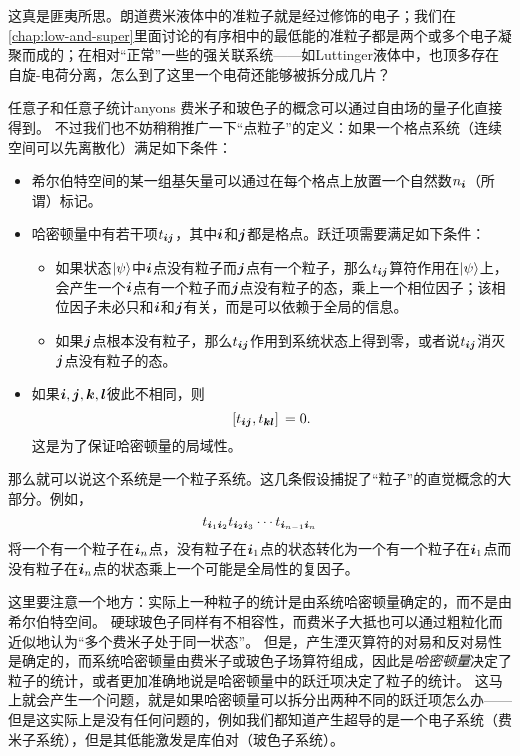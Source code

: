 这真是匪夷所思。朗道费米液体中的准粒子就是经过修饰的电子；我们在\autoref{chap:low-and-super}里面讨论的有序相中的最低能的准粒子都是两个或多个电子凝聚而成的；在相对“正常”一些的强关联系统——如Luttinger液体中，也顶多存在自旋-电荷分离，怎么到了这里一个电荷还能够被拆分成几片？



\begin{back}{任意子和任意子统计}{anyons}
    费米子和玻色子的概念可以通过自由场的量子化直接得到。
    不过我们也不妨稍稍推广一下“点粒子”的定义：如果一个格点系统（连续空间可以先离散化）满足如下条件：
    \begin{itemize}
        \item 希尔伯特空间的某一组基矢量可以通过在每个格点上放置一个自然数$n_{\vb*{i}}$（所谓）标记。
        \item 哈密顿量中有若干项$t_{\vb*{i} \vb*{j}}$，其中$\vb*{i}$和$\vb*{j}$都是格点。跃迁项需要满足如下条件：
        \begin{itemize}
            \item 如果状态$\ket{\psi}$中$\vb*{i}$点没有粒子而$\vb*{j}$点有一个粒子，那么$t_{\vb*{i} \vb*{j}}$算符作用在$\ket{\psi}$上，会产生一个$\vb*{i}$点有一个粒子而$\vb*{j}$点没有粒子的态，乘上一个相位因子；该相位因子未必只和$\vb*{i}$和$\vb*{j}$有关，而是可以依赖于全局的信息。
            \item 如果$\vb*{j}$点根本没有粒子，那么$t_{\vb*{i} \vb*{j}}$作用到系统状态上得到零，或者说$t_{\vb*{i} \vb*{j}}$消灭$\vb*{j}$点没有粒子的态。
        \end{itemize}
        \item 如果$\vb*{i}, \vb*{j}, \vb*{k}, \vb*{l}$彼此不相同，则
        \begin{equation}
            \comm*{t_{\vb*{i} \vb*{j}}}{t_{\vb*{k} \vb*{l}}} = 0.
        \end{equation}
        这是为了保证哈密顿量的局域性。
    \end{itemize}
    那么就可以说这个系统是一个粒子系统。这几条假设捕捉了“粒子”的直觉概念的大部分。例如，
    \[
        t_{\vb*{i}_1 \vb*{i}_2} t_{\vb*{i}_2 \vb*{i}_3} \cdots t_{\vb*{i}_{n-1} \vb*{i}_n} 
    \]
    将一个有一个粒子在$\vb*{i}_n$点，没有粒子在$\vb*{i}_1$点的状态转化为一个有一个粒子在$\vb*{i}_1$点而没有粒子在$\vb*{i}_n$点的状态乘上一个可能是全局性的复因子。

    这里要注意一个地方：实际上一种粒子的统计是由系统哈密顿量确定的，而不是由希尔伯特空间。
    硬球玻色子同样有不相容性，而费米子大抵也可以通过粗粒化而近似地认为“多个费米子处于同一状态”。
    但是，产生湮灭算符的对易和反对易性是确定的，而系统哈密顿量由费米子或玻色子场算符组成，因此是\emph{哈密顿量}决定了粒子的统计，或者更加准确地说是哈密顿量中的跃迁项决定了粒子的统计。
    这马上就会产生一个问题，就是如果哈密顿量可以拆分出两种不同的跃迁项怎么办——但是这实际上是没有任何问题的，例如我们都知道产生超导的是一个电子系统（费米子系统），但是其低能激发是库伯对（玻色子系统）。
    

\end{back}
